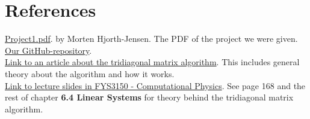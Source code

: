 \documentclass{article}
\begin{document}
\clearpage

\vspace{1cm}

\section{References} \label{References}

\href{https://github.com/CompPhysics/ComputationalPhysics/blob/master/doc/Projects/2019/Project1/pdf/Project1.pdf}{Project1.pdf}. by Morten Hjorth-Jensen. The PDF of the project we were given.\\
\href{https://github.com/Erikbgram/Fys3150}{Our GitHub-repository}. \\

\href{http://www.industrial-maths.com/ms6021_thomas.pdf}{Link to an article about the tridiagonal matrix algorithm}. This includes general theory about the algorithm and how it works. \\

\href{https://github.com/CompPhysics/ComputationalPhysics/blob/master/doc/Lectures/lectures2015.pdf}{Link to lecture slides in FYS3150 - Computational Physics}. See page 168 and the rest of chapter \textbf{6.4 Linear Systems} for theory behind the tridiagonal matrix algorithm.






\end{document}
